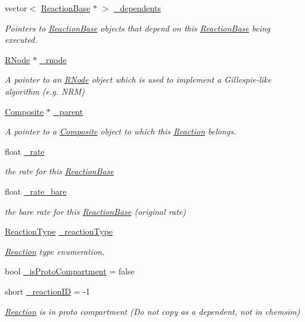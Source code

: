 \begin{DoxyCompactItemize}
\item 
vector$<$ \hyperlink{classReactionBase}{Reaction\+Base} $\ast$ $>$ \hyperlink{classReactionBase_a085e916b6291ef7da5004810c8b58c28}{\+\_\+dependents}
\begin{DoxyCompactList}\small\item\em Pointers to \hyperlink{classReactionBase}{Reaction\+Base} objects that depend on this \hyperlink{classReactionBase}{Reaction\+Base} being executed. \end{DoxyCompactList}\item 
\hyperlink{classRNode}{R\+Node} $\ast$ \hyperlink{classReactionBase_aa402747434b46dbea69b94928140b3a2}{\+\_\+rnode}
\begin{DoxyCompactList}\small\item\em A pointer to an \hyperlink{classRNode}{R\+Node} object which is used to implement a Gillespie-\/like algorithm (e.\+g. N\+R\+M) \end{DoxyCompactList}\item 
\hyperlink{classComposite}{Composite} $\ast$ \hyperlink{classReactionBase_a7ad71ef8d77e5ad85be9126f4f4f4b70}{\+\_\+parent}
\begin{DoxyCompactList}\small\item\em A pointer to a \hyperlink{classComposite}{Composite} object to which this \hyperlink{classReaction}{Reaction} belongs. \end{DoxyCompactList}\item 
float \hyperlink{classReactionBase_a6eea78021fc01eecae6666edc0532e44}{\+\_\+rate}
\begin{DoxyCompactList}\small\item\em the rate for this \hyperlink{classReactionBase}{Reaction\+Base} \end{DoxyCompactList}\item 
float \hyperlink{classReactionBase_a7622cb447ce421d7d062d6bab1105aea}{\+\_\+rate\+\_\+bare}
\begin{DoxyCompactList}\small\item\em the bare rate for this \hyperlink{classReactionBase}{Reaction\+Base} (original rate) \end{DoxyCompactList}\item 
\hyperlink{ReactionBase_8h_a360e20f142dbd097b0d0d0620111b30b}{Reaction\+Type} \hyperlink{classReactionBase_a367c9de5f4d7d589d846c0201e9ca273}{\+\_\+reaction\+Type}
\begin{DoxyCompactList}\small\item\em \hyperlink{classReaction}{Reaction} type enumeration. \end{DoxyCompactList}\item 
bool \hyperlink{classReactionBase_adf06f0937df570e381fb8db4312d81c6}{\+\_\+is\+Proto\+Compartment} = false
\item 
short \hyperlink{classReactionBase_a36d0a7b500e3df2944eb3ff61fa84617}{\+\_\+reaction\+I\+D} = -\/1
\begin{DoxyCompactList}\small\item\em \hyperlink{classReaction}{Reaction} is in proto compartment (Do not copy as a dependent, not in chemsim) \end{DoxyCompactList}\end{DoxyCompactItemize}
